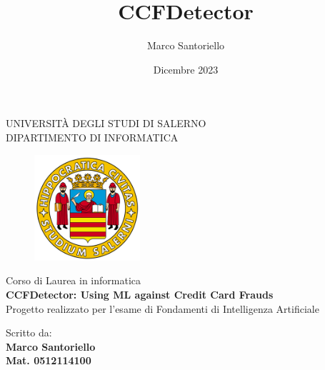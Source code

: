 \documentclass[12pt, a4paper, oneside]{book}
\title{CCFDetector}
\author{Marco Santoriello}
\date{Dicembre 2023}
\begin{document}
\begin{titlepage}
    \begin{center}
        \LARGE{\uppercase{Università degli Studi di Salerno}}\\
        \vspace{5mm}
    	\uppercase{\normalsize Dipartimento di Informatica}\\
    \end{center}
    \begin{figure}[H]
        \centering
        \includegraphics[width=0.35\textwidth]{img/logo_unisa.png}
    \end{figure}
    
    \begin{center}
    	\normalsize{ Corso di Laurea in informatica }\\
    	\vspace{15mm}
        {\LARGE{\bf CCFDetector: Using ML against Credit Card Frauds }}\\
        {\large{ Progetto realizzato per l'esame di Fondamenti di Intelligenza Artificiale}}\\
    	\vspace{10mm}
    \end{center}
    \begin{minipage}[t]{0.4\textwidth}\raggedright
    	{\large{Scritto da: \\ \bf Marco Santoriello\\ Mat. 0512114100}}
    \end{minipage}
    
    \vspace{90mm}

\end{titlepage}

\setcounter{tocdepth}{3} %

\tableofcontents
\end{document}
